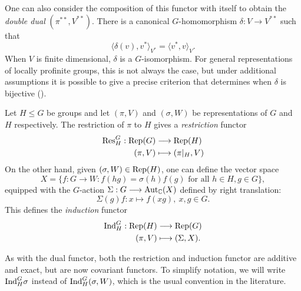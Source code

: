 One can also consider the composition of this functor with itself to obtain the \textit{double dual} $(\pi^{**},V^{**})$. There is a canonical $G$-homomorphism $\delta:V\rightarrow V^{**}$ such that $$\langle\delta(v),v^*\rangle_{V^*}=\langle v^*,v\rangle_{V}.$$
When $V$ is finite dimensional, $\delta$ is a $G$-isomorphism. For general representations of locally profinite groups, this is not always the case, but under additional assumptions it is possible to give a precise criterion that determines when $\delta$ is bijective (\cite[Corollary 2.8, Proposition 2.9]{BH1}).


\begin{defn}\label{def:absresind}
    Let $H\leq G$ be groups and let $(\pi,V)$ and $(\sigma,W)$ be representations of $G$ and $H$ respectively. The restriction of $\pi$ to $H$ gives a \textit{restriction} functor
    \begin{align*}
        \mathrm{Res}_H^G:\mathrm{Rep}(G)&\longrightarrow\mathrm{Rep}(H)\\
        (\pi,V)&\longmapsto(\pi|_H,V)
    \end{align*}
    On the other hand, given $(\sigma,W)\in\mathrm{Rep}(H)$, one can define the vector space
    $$X=\{f:G\to W:f(hg)=\sigma(h)f(g)\text{ for all }h\in H, g\in G\},$$
    equipped with the $G$-action $\Sigma:G\longrightarrow\mathrm{Aut}_{\mathbb{C}}(X)$ defined by right translation:
    $$\Sigma(g)f:x\longmapsto f(xg),\ x,g\in G.$$
    This defines the \textit{induction} functor
    \begin{align*}
        \mathrm{Ind}_H^G:\mathrm{Rep}(H)&\longrightarrow\mathrm{Rep}(G)\\
        (\pi,V)&\longmapsto(\Sigma,X).
    \end{align*}
\end{defn}

As with the dual functor, both the restriction and induction functor are additive and exact, but are now covariant functors. To simplify notation, we will write $\mathrm{Ind}_H^G\sigma$ instead of $\mathrm{Ind}_H^G(\sigma,W)$, which is the usual convention in the literature.

